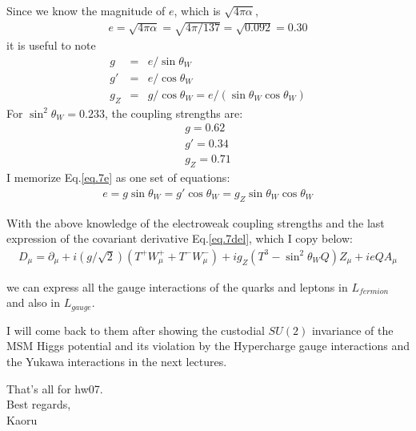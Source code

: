 \documentclass[12pt]{article}
\def\del{{\partial}}
\begin{document}
  Since we know the magnitude of $e$, which is $\sqrt{4\pi\alpha}$,
\begin{eqnarray}
  e = \sqrt{ 4\pi \alpha }
        = \sqrt{ 4\pi /137 }
        = \sqrt{ 0.092 }
        = 0.30
\end{eqnarray}
  it is useful to note
\begin{eqnarray}
  g   &=& e/\sin\theta_W \\
  g'  &=& e/\cos\theta_W \\
  g_Z &=& g/\cos\theta_W = e/(\sin\theta_W \cos\theta_W) 
\end{eqnarray}
  For $\sin^2\theta_W = 0.233$, the coupling strengths are:
\begin{eqnarray}
  g   = 0.62\\
  g'  = 0.34 \\
  g_Z = 0.71
\end{eqnarray}
  I memorize Eq.\ref{eq.7e} as one set of equations:
\begin{eqnarray}
  e = g \sin\theta_W
    = g' \cos\theta_W
    = g_Z \sin\theta_W \cos\theta_W
\end{eqnarray}

  With the above knowledge of the electroweak coupling strengths
  and the last expression of the covariant derivative Eq.\ref{eq.7del},
  which I copy below:
\begin{eqnarray}
  D_\mu =\del_\mu +i(g/\sqrt2)(T^+W^+_\mu + T^-W^-_\mu)
                         +ig_Z(T^3 -\sin^2\theta_W Q) Z_\mu
                         +ieQ A_\mu
\end{eqnarray}

  we can express all the gauge interactions of the quarks
  and leptons in $L_{fermion}$ and also in $L_{gauge}$.

  I will come back to them after showing the custodial $SU(2)$
  invariance of the MSM Higgs potential and its violation
  by the Hypercharge gauge interactions and the Yukawa
  interactions in the next lectures.

  That's all for hw07.\\

Best regards,\\

Kaoru
\end{document}
